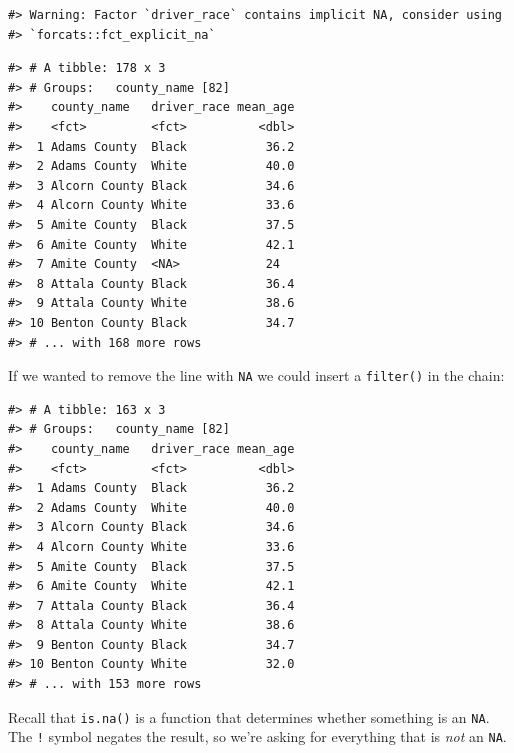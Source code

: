 \documentclass[]{book}
\newenvironment{Shaded}{\begin{snugshade}}{\end{snugshade}}
\newcommand{\DataTypeTok}[1]{\textcolor[rgb]{0.13,0.29,0.53}{#1}}
\newcommand{\KeywordTok}[1]{\textcolor[rgb]{0.13,0.29,0.53}{\textbf{#1}}}
\newcommand{\NormalTok}[1]{#1}
\newcommand{\OperatorTok}[1]{\textcolor[rgb]{0.81,0.36,0.00}{\textbf{#1}}}
\newcommand{\OtherTok}[1]{\textcolor[rgb]{0.56,0.35,0.01}{#1}}
\newcommand{\StringTok}[1]{\textcolor[rgb]{0.31,0.60,0.02}{#1}}
\begin{document}
\begin{verbatim}
#> Warning: Factor `driver_race` contains implicit NA, consider using
#> `forcats::fct_explicit_na`
\end{verbatim}

\begin{verbatim}
#> # A tibble: 178 x 3
#> # Groups:   county_name [82]
#>    county_name   driver_race mean_age
#>    <fct>         <fct>          <dbl>
#>  1 Adams County  Black           36.2
#>  2 Adams County  White           40.0
#>  3 Alcorn County Black           34.6
#>  4 Alcorn County White           33.6
#>  5 Amite County  Black           37.5
#>  6 Amite County  White           42.1
#>  7 Amite County  <NA>            24  
#>  8 Attala County Black           36.4
#>  9 Attala County White           38.6
#> 10 Benton County Black           34.7
#> # ... with 168 more rows
\end{verbatim}

If we wanted to remove the line with \texttt{NA} we could insert a \texttt{filter()} in the chain:

\begin{Shaded}
\end{Shaded}

\begin{verbatim}
#> # A tibble: 163 x 3
#> # Groups:   county_name [82]
#>    county_name   driver_race mean_age
#>    <fct>         <fct>          <dbl>
#>  1 Adams County  Black           36.2
#>  2 Adams County  White           40.0
#>  3 Alcorn County Black           34.6
#>  4 Alcorn County White           33.6
#>  5 Amite County  Black           37.5
#>  6 Amite County  White           42.1
#>  7 Attala County Black           36.4
#>  8 Attala County White           38.6
#>  9 Benton County Black           34.7
#> 10 Benton County White           32.0
#> # ... with 153 more rows
\end{verbatim}

Recall that \texttt{is.na()} is a function that determines whether something is an \texttt{NA}. The \texttt{!} symbol negates the result, so we're asking for everything that is \emph{not} an \texttt{NA}.
\end{document}
